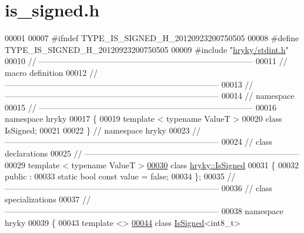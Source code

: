 \hypertarget{is__signed_8h_source}{\section{is\-\_\-signed.\-h}
}

\begin{DoxyCode}
00001 
00007 \textcolor{preprocessor}{#ifndef TYPE\_IS\_SIGNED\_H\_20120923200750505}
00008 \textcolor{preprocessor}{}\textcolor{preprocessor}{#define TYPE\_IS\_SIGNED\_H\_20120923200750505}
00009 \textcolor{preprocessor}{}\textcolor{preprocessor}{#include "\hyperlink{stdint_8h}{hryky/stdint.h}"}
00010 \textcolor{comment}{//
      ------------------------------------------------------------------------------}
00011 \textcolor{comment}{// macro definition}
00012 \textcolor{comment}{//
      ------------------------------------------------------------------------------}
00013 \textcolor{comment}{//
      ------------------------------------------------------------------------------}
00014 \textcolor{comment}{// namespace}
00015 \textcolor{comment}{//
      ------------------------------------------------------------------------------}
00016 \textcolor{keyword}{namespace }hryky
00017 \{
00019     \textcolor{keyword}{template} < \textcolor{keyword}{typename} ValueT >
00020     \textcolor{keyword}{class }IsSigned;
00021 
00022 \} \textcolor{comment}{// namespace hryky}
00023 \textcolor{comment}{//
      ------------------------------------------------------------------------------}
00024 \textcolor{comment}{// class declarations}
00025 \textcolor{comment}{//
      ------------------------------------------------------------------------------}
00029 \textcolor{comment}{}\textcolor{keyword}{template} < \textcolor{keyword}{typename} ValueT >
\hypertarget{is__signed_8h_source_l00030}{}\hyperlink{classhryky_1_1_is_signed}{00030} \textcolor{keyword}{class }\hyperlink{classhryky_1_1_is_signed}{hryky::IsSigned}
00031 \{
00032 \textcolor{keyword}{public} :
00033     \textcolor{keyword}{static} \textcolor{keywordtype}{bool} \textcolor{keyword}{const} value = \textcolor{keyword}{false};
00034 \};
00035 \textcolor{comment}{//
      ------------------------------------------------------------------------------}
00036 \textcolor{comment}{// class specializations}
00037 \textcolor{comment}{//
      ------------------------------------------------------------------------------}
00038 \textcolor{keyword}{namespace }hryky
00039 \{
00043 \textcolor{keyword}{template} <>
\hypertarget{is__signed_8h_source_l00044}{}\hyperlink{classhryky_1_1_is_signed_3_01int8__t_01_4}{00044} \textcolor{keyword}{class }\hyperlink{classhryky_1_1_is_signed}{IsSigned}<int8\_t>

\end{DoxyCode}
